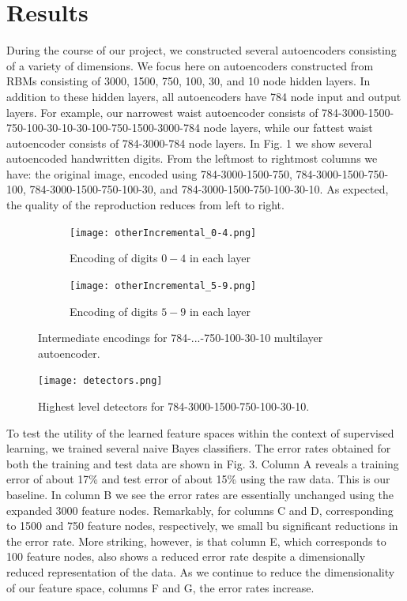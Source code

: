 \documentclass{article}
\begin{document}
\section{Results}\label{sec:results}

During the course of our project, we constructed several autoencoders consisting
of a variety of dimensions. We focus here on autoencoders constructed from RBMs
consisting of 3000, 1500, 750, 100, 30, and 10 node hidden layers. In addition
to these hidden layers, all autoencoders have 784 node input and output layers.
For example, our narrowest waist autoencoder consists of
784-3000-1500-750-100-30-10-30-100-750-1500-3000-784 node layers, while our
fattest waist autoencoder consists of 784-3000-784 node layers. In Fig. 1 we
show several autoencoded handwritten digits. From the leftmost to rightmost
columns we have: the original image, encoded using 784-3000-1500-750,
784-3000-1500-750-100, 784-3000-1500-750-100-30, and
784-3000-1500-750-100-30-10. As expected, the quality of the reproduction
reduces from left to right.

\begin{figure}[htbp!]
    \centering
    \begin{subfigure}{.45\textwidth}
        \centering
        \texttt{[image: otherIncremental\_0-4.png]}
        \caption{Encoding of digits $0-4$ in each layer}
        \label{fig:incremental_0-4}
    \end{subfigure}%
    \quad
    \begin{subfigure}{.45\textwidth}
        \centering
        \texttt{[image: otherIncremental\_5-9.png]}
        \caption{Encoding of digits $5-9$ in each layer}
        \label{fig:incremental_5-9}
    \end{subfigure}
    \caption{Intermediate encodings for 784-...-750-100-30-10 multilayer autoencoder.}
\end{figure}

\begin{figure}[htbp!]
    \centering
    \texttt{[image: detectors.png]}
    \caption{Highest level detectors for 784-3000-1500-750-100-30-10.}
    \label{fig:detectors}
\end{figure}%

To test the utility of the learned feature spaces within the context of
supervised learning, we trained several naive Bayes classifiers. The error rates
obtained for both the training and test data are shown in Fig. 3. Column A
reveals a training error of about 17\% and test error of about 15\% using the
raw data. This is our baseline. In column B we see the error rates are
essentially unchanged using the expanded 3000 feature nodes. Remarkably, for
columns C and D, corresponding to 1500 and 750 feature nodes, respectively, we
small bu significant reductions in the error rate. More striking, however, is
that column E, which corresponds to 100 feature nodes, also shows a reduced
error rate despite a dimensionally reduced representation of the data. As we
continue to reduce the dimensionality of our feature space, columns F and G, the
error rates increase.
\end{document}
